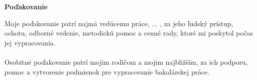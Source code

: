 \newpage
\thispagestyle{plain}
\vspace*{14cm} 
\noindent
\begin{center}
	{\large\textbf{Poďakovanie}} \\
\end{center}

\noindent
Moje poďakovanie patrí najmä vedúcemu práce, ... , za jeho ľudský prístup, ochotu, odborné vedenie, metodickú pomoc a cenné rady, ktoré mi poskytol počas jej vypracovania. \\ \\
\noindent
Osobitné poďakovanie patrí mojim rodičom a mojim najbližším, za ich podporu, pomoc a vytvorenie podmienok pre vypracovanie bakalárskej práce.

\vspace*{0.7cm}
\noindent
\hspace{11.2cm}\Author